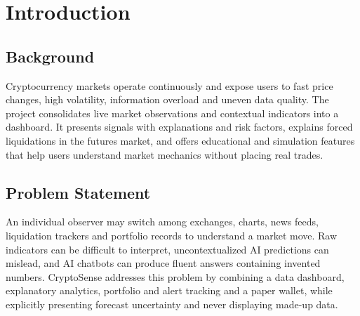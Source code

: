 
\section{Introduction}
\subsection{Background}
Cryptocurrency markets operate continuously and expose users to fast price changes, high volatility, information overload and uneven data quality. The project consolidates live market observations and contextual indicators into a dashboard. It presents signals with explanations and risk factors, explains forced liquidations in the futures market, and offers educational and simulation features that help users understand market mechanics without placing real trades.

\subsection{Problem Statement}
An individual observer may switch among exchanges, charts, news feeds, liquidation trackers and portfolio records to understand a market move. Raw indicators can be difficult to interpret, uncontextualized AI predictions can mislead, and AI chatbots can produce fluent answers containing invented numbers. CryptoSense addresses this problem by combining a data dashboard, explanatory analytics, portfolio and alert tracking and a paper wallet, while explicitly presenting forecast uncertainty and never displaying made-up data.

